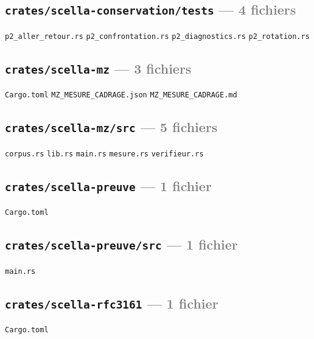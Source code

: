 \documentclass[10pt]{report}
\newcommand{\code}[1]{\texttt{\small #1}}
\begin{document}
\subsection*{\code{crates/scella-conservation/tests} \normalfont\textcolor{grey}{--- 4 fichiers}}
\begin{sloppypar}\footnotesize\raggedright
\code{p2\_aller\_retour.rs} \;\textbullet\; \code{p2\_confrontation.rs} \;\textbullet\; \code{p2\_diagnostics.rs} \;\textbullet\; \code{p2\_rotation.rs}
\end{sloppypar}

\subsection*{\code{crates/scella-mz} \normalfont\textcolor{grey}{--- 3 fichiers}}
\begin{sloppypar}\footnotesize\raggedright
\code{Cargo.toml} \;\textbullet\; \code{MZ\_MESURE\_CADRAGE.json} \;\textbullet\; \code{MZ\_MESURE\_CADRAGE.md}
\end{sloppypar}

\subsection*{\code{crates/scella-mz/src} \normalfont\textcolor{grey}{--- 5 fichiers}}
\begin{sloppypar}\footnotesize\raggedright
\code{corpus.rs} \;\textbullet\; \code{lib.rs} \;\textbullet\; \code{main.rs} \;\textbullet\; \code{mesure.rs} \;\textbullet\; \code{verifieur.rs}
\end{sloppypar}

\subsection*{\code{crates/scella-preuve} \normalfont\textcolor{grey}{--- 1 fichier}}
\begin{sloppypar}\footnotesize\raggedright
\code{Cargo.toml}
\end{sloppypar}

\subsection*{\code{crates/scella-preuve/src} \normalfont\textcolor{grey}{--- 1 fichier}}
\begin{sloppypar}\footnotesize\raggedright
\code{main.rs}
\end{sloppypar}

\subsection*{\code{crates/scella-rfc3161} \normalfont\textcolor{grey}{--- 1 fichier}}
\begin{sloppypar}\footnotesize\raggedright
\code{Cargo.toml}
\end{sloppypar}
\end{document}
